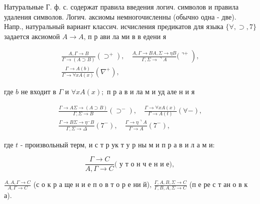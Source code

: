 \documentclass[10pt]{article}
\begin{document}
Натуральные Г. ф. с. содержат правила введения логич. символов и правила удаления символов. Логич. аксиомы немногочисленны (обычно одна - две). Напр., натуральный вариант классич. исчисления предикатов для языка $\{\forall, \supset, 7\}$ задается аксиомой $A \rightarrow A$, п р ави ла ми в в едени я



\[

\begin{gathered}

\left.\frac{A, \Gamma \rightarrow B}{\Gamma \rightarrow(A \supset B)}\left(\supset^{+}\right), \quad \frac{A, \Gamma \rightarrow B A, \Sigma \rightarrow \eta B}{\Gamma, \Sigma \rightarrow\urcorner A}(\urcorner^{+}\right), \\

\frac{\Gamma \rightarrow A(b)}{\Gamma \rightarrow \forall x A(x)}\left(\nabla^{+}\right),

\end{gathered}

\]



где $b$ не входит в $\Gamma$ и $\forall x A(x) ;$ п р а в и ла м и уд але н и я



\[

\begin{gathered}

\frac{\Gamma \rightarrow A \Sigma \rightarrow(A \supset B)}{\Gamma, \Sigma \rightarrow B}\left(\supset^{-}\right), \quad \frac{\Gamma \rightarrow \forall x A(x)}{\Gamma \rightarrow A(t)}(\forall-), \\

\frac{\Gamma \rightarrow B \Sigma \rightarrow \eta^{-} B}{\Gamma, \Sigma \rightarrow \Delta}\left(7^{-}\right), \quad \frac{\Gamma \rightarrow \eta\urcorner A}{\Gamma \rightarrow A}\left(7^{-}\right),

\end{gathered}

\]



где $t$ - произвольный терм, и с т р ук т у р ны м и п р а в и л а м и:



\[

\frac{\Gamma \rightarrow C}{A, \Gamma \rightarrow C}(\text { у т о н ч е н и е), }

\]



$\frac{A, A, \Gamma \rightarrow C}{A, \Gamma \rightarrow C}$ (с о к р а ще н и е п о в т о р е ни й), $\frac{\Gamma, A, B, \Sigma \rightarrow C}{\Gamma, B, A, \Sigma \rightarrow C}$ (п е ре с т ан о в к а).
\end{document}
